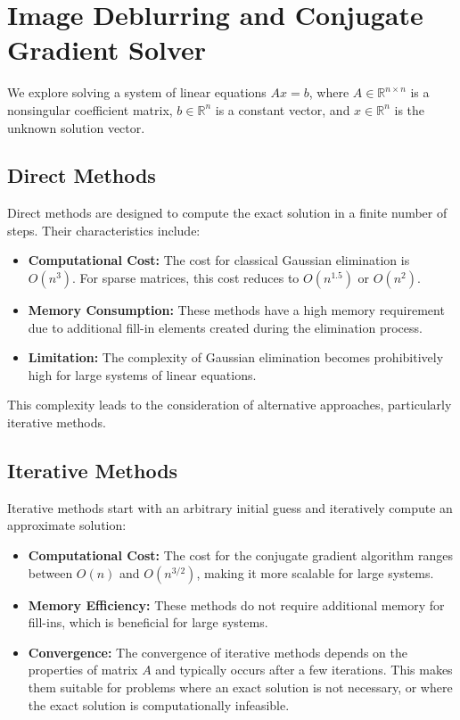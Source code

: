 \documentclass[unicode,11pt,a4paper,oneside,numbers=endperiod,openany]{scrartcl}
\begin{document}
\section{Image Deblurring and Conjugate Gradient Solver}

We explore solving a system of linear equations \( Ax = b \), where \( A \in \mathbb{R}^{n \times n} \) is a nonsingular coefficient matrix, \( b \in \mathbb{R}^n \) is a constant vector, and \( x \in \mathbb{R}^n \) is the unknown solution vector.

\subsection{Direct Methods}
Direct methods are designed to compute the exact solution in a finite number of steps. Their characteristics include:
\begin{itemize}
    \item \textbf{Computational Cost:} The cost for classical Gaussian elimination is \( O(n^3) \). For sparse matrices, this cost reduces to \( O(n^{1.5}) \) or \( O(n^2) \).

    \item \textbf{Memory Consumption:} These methods have a high memory requirement due to additional fill-in elements created during the elimination process.

    \item \textbf{Limitation:} The complexity of Gaussian elimination becomes prohibitively high for large systems of linear equations.
\end{itemize}

This complexity leads to the consideration of alternative approaches, particularly iterative methods.

\subsection{Iterative Methods}
Iterative methods start with an arbitrary initial guess and iteratively compute an approximate solution:
\begin{itemize}
    \item \textbf{Computational Cost:} The cost for the conjugate gradient algorithm ranges between \( O(n) \) and \( O(n^{3/2}) \), making it more scalable for large systems.

    \item \textbf{Memory Efficiency:} These methods do not require additional memory for fill-ins, which is beneficial for large systems.

    \item \textbf{Convergence:} The convergence of iterative methods depends on the properties of matrix \( A \) and typically occurs after a few iterations. This makes them suitable for problems where an exact solution is not necessary, or where the exact solution is computationally infeasible.
\end{itemize}
\end{document}
